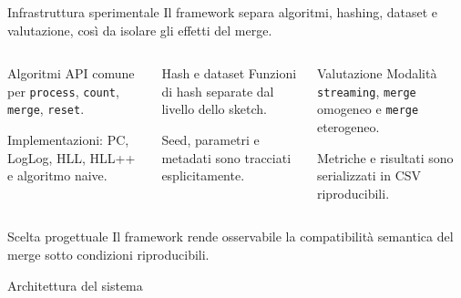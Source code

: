 \documentclass[aspectratio=169,11pt]{beamer}
\begin{document}
\begin{frame}{Infrastruttura sperimentale}
  Il framework separa algoritmi, hashing, dataset e valutazione,
  cos\`i da isolare gli effetti del merge.

  \begin{columns}[T,onlytextwidth]
      \begin{block}{Algoritmi}
        \small
        API comune per \texttt{process}, \texttt{count}, \texttt{merge}, \texttt{reset}.

        Implementazioni: PC, LogLog, HLL, HLL++ e algoritmo naive.
      \end{block}
      \begin{block}{Hash e dataset}
        \small
        Funzioni di hash separate dal livello dello sketch.

        Seed, parametri e metadati sono tracciati esplicitamente.
      \end{block}
      \begin{block}{Valutazione}
        \small
        Modalit\`a \texttt{streaming}, \texttt{merge} omogeneo e \texttt{merge} eterogeneo.

        Metriche e risultati sono serializzati in CSV riproducibili.
      \end{block}
  \end{columns}

  \begin{alertblock}{Scelta progettuale}
    \small
    Il framework rende osservabile la compatibilit\`a semantica del merge sotto
    condizioni riproducibili.
  \end{alertblock}
\end{frame}

\begin{frame}{Architettura del sistema}
  \centering
  \resizebox{0.95\textwidth}{!}{}
\end{frame}
\end{document}
